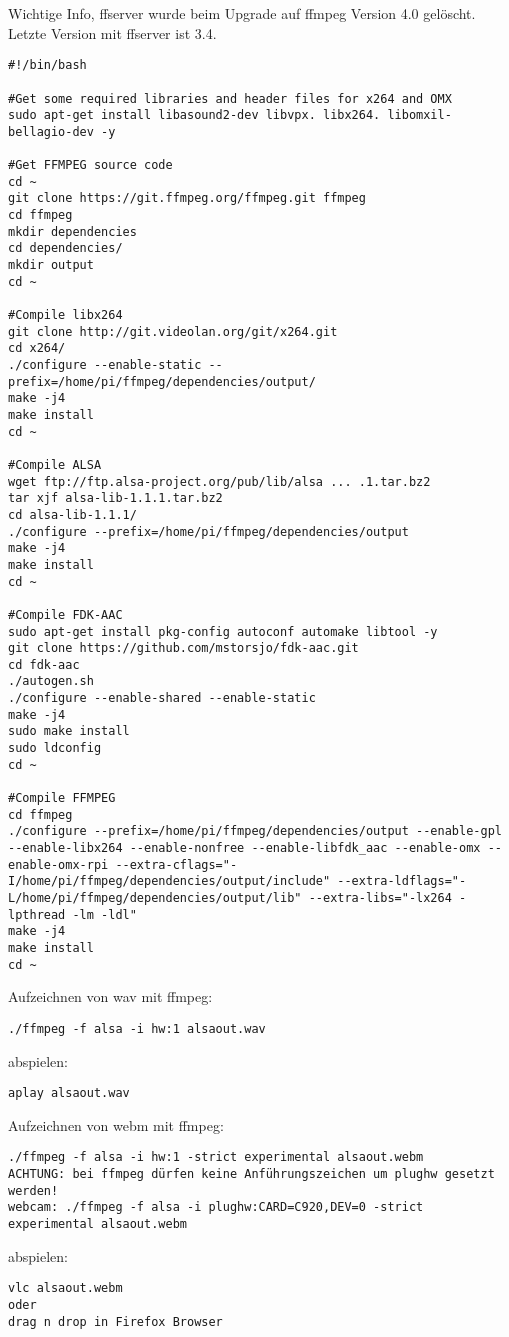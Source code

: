 Wichtige Info, ffserver wurde beim Upgrade auf ffmpeg Version 4.0 gelöscht. Letzte Version mit ffserver ist 3.4.

\begin{verbatim}
#!/bin/bash

#Get some required libraries and header files for x264 and OMX
sudo apt-get install libasound2-dev libvpx. libx264. libomxil-bellagio-dev -y

#Get FFMPEG source code
cd ~
git clone https://git.ffmpeg.org/ffmpeg.git ffmpeg
cd ffmpeg
mkdir dependencies
cd dependencies/
mkdir output
cd ~

#Compile libx264
git clone http://git.videolan.org/git/x264.git
cd x264/
./configure --enable-static --prefix=/home/pi/ffmpeg/dependencies/output/
make -j4
make install
cd ~

#Compile ALSA
wget ftp://ftp.alsa-project.org/pub/lib/alsa ... .1.tar.bz2
tar xjf alsa-lib-1.1.1.tar.bz2
cd alsa-lib-1.1.1/
./configure --prefix=/home/pi/ffmpeg/dependencies/output
make -j4
make install
cd ~

#Compile FDK-AAC
sudo apt-get install pkg-config autoconf automake libtool -y
git clone https://github.com/mstorsjo/fdk-aac.git
cd fdk-aac
./autogen.sh
./configure --enable-shared --enable-static
make -j4
sudo make install
sudo ldconfig
cd ~

#Compile FFMPEG
cd ffmpeg
./configure --prefix=/home/pi/ffmpeg/dependencies/output --enable-gpl --enable-libx264 --enable-nonfree --enable-libfdk_aac --enable-omx --enable-omx-rpi --extra-cflags="-I/home/pi/ffmpeg/dependencies/output/include" --extra-ldflags="-L/home/pi/ffmpeg/dependencies/output/lib" --extra-libs="-lx264 -lpthread -lm -ldl"
make -j4
make install
cd ~

\end{verbatim}	
	
Aufzeichnen von wav mit ffmpeg:
\begin{verbatim}./ffmpeg -f alsa -i hw:1 alsaout.wav \end{verbatim}
abspielen:
\begin{verbatim}aplay alsaout.wav \end{verbatim}
Aufzeichnen von webm mit ffmpeg:
\begin{verbatim}
./ffmpeg -f alsa -i hw:1 -strict experimental alsaout.webm  
ACHTUNG: bei ffmpeg dürfen keine Anführungszeichen um plughw gesetzt werden!
webcam: ./ffmpeg -f alsa -i plughw:CARD=C920,DEV=0 -strict experimental alsaout.webm

\end{verbatim}
abspielen:
\begin{verbatim}
vlc alsaout.webm 
oder
drag n drop in Firefox Browser
\end{verbatim}

